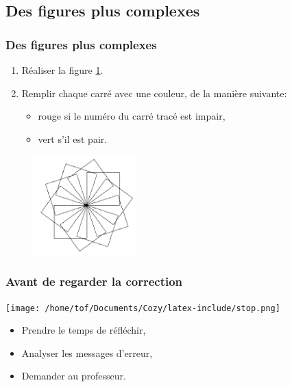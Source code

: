 \documentclass[svgnames,11pt]{beamer}
\begin{document}
\subsection{Des figures plus complexes}
\begin{frame}
    \frametitle{Des figures plus complexes}

    \begin{activite}
        \begin{enumerate}
        \item Réaliser la figure \ref{carres}.
        \item Remplir chaque carré avec une couleur, de la manière suivante:
        \begin{itemize}
        \item rouge si le numéro du carré tracé est impair,
        \item vert s'il est pair.
        \end{itemize}
        \end{enumerate}
        \end{activite}
        \begin{figure}[!h]
        \centering
        \includegraphics[width=4cm]{ressources/carres.png}
        \label{carres}
        \end{figure}

\end{frame}
\begin{frame}
    \frametitle{Avant de regarder la correction}
\begin{center}
    \centering
    \texttt{[image: /home/tof/Documents/Cozy/latex-include/stop.png]}
    \end{center}
{\Large
    \begin{itemize}
        \item Prendre le temps de réfléchir,
        \item Analyser les messages d'erreur,
        \item Demander au professeur.
    \end{itemize}
}
\end{frame}
\end{document}
